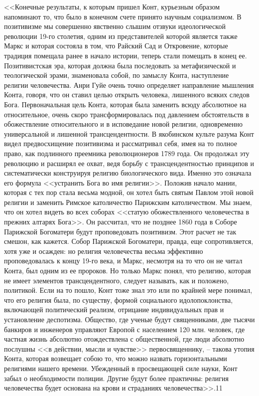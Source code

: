 \documentclass{book}
\begin{document}
<<Конечные результаты, к которым пришел Конт, курьезным образом напоминают то, что было в конечном счете принято научным социализмом. В позитивизме мы совершенно явственно слышим отзвуки идеологической революции 19-го столетия, одним из представителей которой является также Маркс и которая состояла в том, что Райский Сад и Откровение, которые традиция помещала ранее в начало истории, теперь стали помещать в конец ее. Позитивистская эра, которая должна была последовать за метафизической и теологической эрами, знаменовала собой, по замыслу Конта, наступление религии человечества. Анри Гуйе очень точно определяет направление мышления Конта, говоря, что он ставил целью открыть человека, лишенного всяких следов Бога. Первоначальная цель Конта, которая была заменить всюду абсолютное на относительное, очень скоро трансформировалась под давлением обстоятельств в обожествление относительного и в исповедание новой религии, одновременно универсальной и лишенной трансцендентности. В якобинском культе разума Конт видел 
предвосхищение позитивизма и рассматривал себя, имея на то полное право, как подлинного преемника революционеров 1789 года. Он продолжал эту революцию и расширял ее охват, ведя борьбу с трансцендентностью принципов и систематически конструируя религию биологического вида. Именно это означала его формула <<устранить Бога во имя религии>>. Положив начало мании, которая с тех пор стала весьма модной, он хотел быть святым Павлом этой новой религии и заменить Римское католичество Парижским католичеством. Мы знаем, что он хотел видеть во всех соборах <<статую обожествленного человечества в прежних алтарях Бога>>. Он рассчитал, что не позднее 1860 года в Соборе Парижской Богоматери будут проповедовать позитивизм. Этот расчет не так смешон, как кажется. Собор Парижской Богоматери, правда, еще сопротивляется, хотя уже и осажден: но рели­гия человечества весьма эффективно проповедовалась к концу 19-го века, и Маркс, несмотря на то что он не читал Конта, был одним из ее пророков. Но только Маркс понял, что рели­гию, 
которая не имеет элементов трансцендентного, следует называть, как и положено, политикой. Если на то пошло, Конт тоже знал это или по крайней мере понимал, что его религия была, по существу, формой социального идолопоклонства, включающей политический реализм, отрицание индивидуальных прав и установление деспотизма. Общество, где ученые будут священниками, две тысячи банкиров и инженеров управ­ляют Европой с населением 120 млн. человек, где частная жизнь абсолютно отождествлена с общественной, где люди абсолютно послушны <<в действии, мысли и чувстве>> первосвященнику, -- такова утопия Конта, которая возвещает собою то, что можно назвать горизонтальными религиями нашего времени. Убежденный в просвещающей силе науки, Конт забыл о необходи­мости полиции. Другие будут более практичны: религия человечества будет основана на крови и страданиях человечества>>.11
\end{document}
